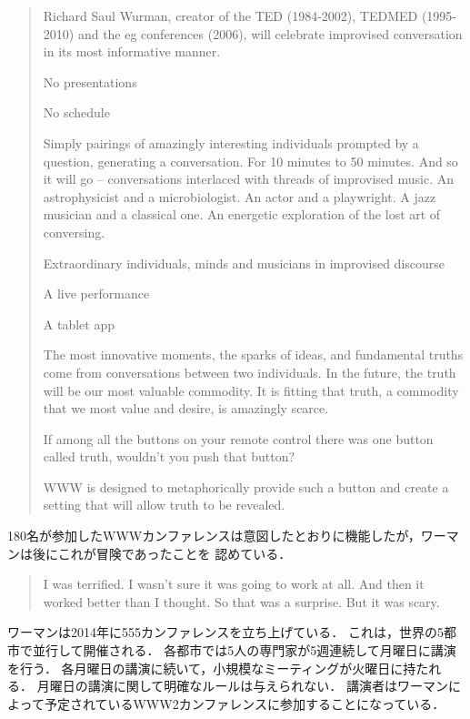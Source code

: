 \documentclass[submit,techreq,jkeyword,noauthor]{ipsj}
\begin{document}
\begin{quote}
Richard Saul Wurman, creator of the TED (1984-2002), TEDMED (1995-2010) and the eg 
conferences (2006), will celebrate improvised conversation in its most informative manner.

No presentations

No schedule

Simply pairings of amazingly interesting individuals prompted by a question, generating a 
conversation. For 10 minutes to 50 minutes. And so it will go – conversations interlaced 
with threads of improvised music. An astrophysicist and a microbiologist. An actor and a 
playwright. A jazz musician and a classical one. An energetic exploration of the lost art 
of conversing.

Extraordinary individuals,
minds and musicians in improvised discourse

A live performance

A tablet app

The most innovative moments, the sparks of ideas, and fundamental truths come from 
conversations between two individuals.
In the future, the truth will be our most valuable commodity. It is fitting that truth, 
a commodity that we most value and desire, is amazingly scarce.

If among all the buttons on your remote control there was one button called truth, 
wouldn't you push that button?

WWW is designed to metaphorically provide such a button and create a setting that 
will allow truth to be revealed.	
\end{quote}

180名が参加したWWWカンファレンスは意図したとおりに機能したが，ワーマンは後にこれが冒険であったことを
認めている．\cite{ek}

\begin{quote}
I was terrified. I wasn't sure it was going to work at all. And then it worked better 
than I thought. So that was a surprise. But it was scary.
\end{quote}


ワーマンは2014年に555カンファレンスを立ち上げている．
これは，世界の5都市で並行して開催される．
各都市では5人の専門家が5週連続して月曜日に講演を行う．
各月曜日の講演に続いて，小規模なミーティングが火曜日に持たれる．
月曜日の講演に関して明確なルールは与えられない．
講演者はワーマンによって予定されているWWW2カンファレンスに参加することになっている．\cite{ek}
\end{document}
